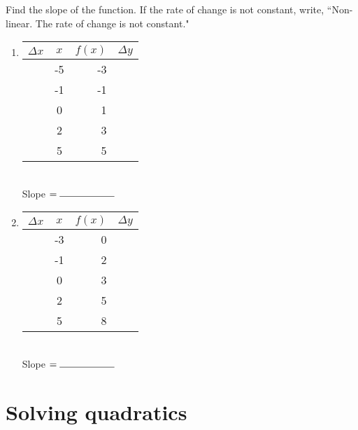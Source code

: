 \documentclass[12pt, oneside]{article}
\begin{document}
  \item Find the slope of the function. If the rate of change is not constant, write, ``Non-linear. The rate of change is not constant."

    \begin{multicols}{2}
    \begin{enumerate}
      \item
        \begin{tabular}{|c|c|r|c|}
          \hline
          $\Delta x$ & $x$ & $f(x)$ & $\Delta y$\\
          \hline
          & -5 & -3 &\\
          \hline
          & -1 & -1 &\\
          \hline
          & 0 & 1 &\\
          \hline
          & 2 & 3 &\\
          \hline
          & 5 & 5 &\\
          \hline
        \end{tabular}\\[0.85cm]

        Slope $= \rule{2cm}{0.15mm}$\\

        \item
          \begin{tabular}{|c|c|r|c|}
            \hline
            $\Delta x$ & $x$ & $f(x)$ & $\Delta y$\\
            \hline
            & -3 & 0 &\\
            \hline
            & -1 & 2 &\\
            \hline
            & 0 & 3 &\\
            \hline
            & 2 & 5 &\\
            \hline
            & 5 & 8 &\\
            \hline
          \end{tabular}\\[0.85cm]

          Slope $= \rule{2cm}{0.15mm}$\\

        \end{enumerate}
      \end{multicols}

      \section{Solving quadratics}
\end{document}
